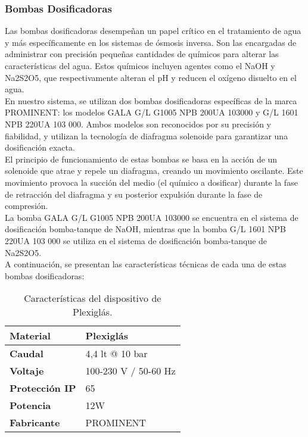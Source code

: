 \subsubsection{Bombas Dosificadoras}

Las bombas dosificadoras desempeñan un papel crítico en el tratamiento de agua y más específicamente en los sistemas de ósmosis inversa. Son las encargadas de administrar con precisión pequeñas cantidades de químicos para alterar las características del agua. Estos químicos incluyen agentes como el NaOH y Na2S2O5, que respectivamente alteran el pH y reducen el oxígeno disuelto en el agua.\\

En nuestro sistema, se utilizan dos bombas dosificadoras específicas de la marca PROMINENT: los modelos GALA G/L G1005 NPB 200UA 103000 y G/L 1601 NPB 220UA 103 000. Ambos modelos son reconocidos por su precisión y fiabilidad, y utilizan la tecnología de diafragma solenoide para garantizar una dosificación exacta.\\

El principio de funcionamiento de estas bombas se basa en la acción de un solenoide que atrae y repele un diafragma, creando un movimiento oscilante. Este movimiento provoca la succión del medio (el químico a dosificar) durante la fase de retracción del diafragma y su posterior expulsión durante la fase de compresión.\\

La bomba GALA G/L G1005 NPB 200UA 103000 se encuentra en el sistema de dosificación bomba-tanque de NaOH, mientras que la bomba G/L 1601 NPB 220UA 103 000 se utiliza en el sistema de dosificación bomba-tanque de Na2S2O5.\\

A continuación, se presentan las características técnicas de cada una de estas bombas dosificadoras:\\

\begin{table}[H]
    \centering
    \caption{Características del dispositivo de Plexiglás.}
    \label{table:plexiglas_device}
    \begin{tabular}{| L{5cm} | L{5cm} |}
        \hline
        \textbf{Material} & Plexiglás \\
        \hline
        \textbf{Caudal} & 4,4 lt @ 10 bar \\
        \hline
        \textbf{Voltaje} & 100-230 V / 50-60 Hz \\
        \hline
        \textbf{Protección IP} & 65 \\
        \hline
        \textbf{Potencia} & 12W \\
        \hline
        \textbf{Fabricante} & PROMINENT \\
        \hline
    \end{tabular}
\end{table}

